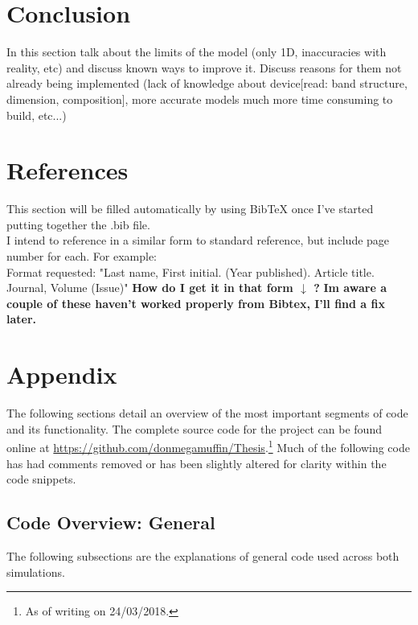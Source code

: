 \documentclass[titlepage]{article}
\begin{document}
\section{Conclusion}
In this section talk about the limits of the model (only 1D, inaccuracies with reality, etc) and discuss known ways to improve it. Discuss reasons for them not already being implemented (lack of knowledge about device[read: band structure, dimension, composition], more accurate models much more time consuming to build, etc...) \\


\section{References}
This section will be filled automatically by using BibTeX once I've started putting together the .bib file.\\
I intend to reference in a similar form to standard reference, but include page number for each. For example:\\
\medbreak
Format requested: "Last name, First initial. (Year published). Article title. Journal, Volume (Issue)" \textbf{How do I get it in that form $\downarrow$ ?} \textbf{Im aware a couple of these haven't worked properly from Bibtex, I'll find a fix later.}
{}

\newpage

\section{Appendix}
The following sections detail an overview of the most important segments of code and its functionality. The complete source code for the project can be found online at \url{https://github.com/donmegamuffin/Thesis}.\footnote{As of writing on 24/03/2018.} Much of the following code has had comments removed or has been slightly altered for clarity within the code snippets.
\subsection{Code Overview: General}
The following subsections are the explanations of general code used across both simulations.
\end{document}
